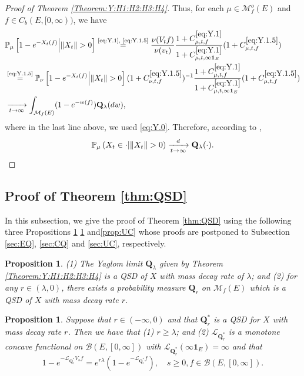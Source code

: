 \documentclass[12pt,a4paper]{amsart}
\numberwithin{equation}{section}
\theoremstyle{plain}
\newtheorem{prop}[thm]{Proposition}
\theoremstyle{definition}
\theoremstyle{remark}
\begin{document}
\begin{proof}[Proof of Theorem \ref{Theorem:Y:H1:H2:H3:H4}]
	Thus, for each $\mu \in \mathcal M^o_f(E)$ and $f\in C_b(E,[0,\infty))$, we have
\begin{align}
&\mathbb P_\mu \left[1 - e^{-X_t(f)} \middle|\|X_t\|>0\right]
	 \overset{\text{\eqref{eq:Y.1}, \eqref{eq:Y.1.5}}}= \frac{ \nu(V_tf) }{ \nu(v_t) } \frac{1+C^{\eqref{eq:Y.1}}_{\mu,t,f}}{1+C^{\eqref{eq:Y.1}}_{\mu, t,\infty \mathbf 1_E}}(1+ C^{\eqref{eq:Y.1.5}}_{\mu,t,f})
	\\& \overset{\text{\eqref{eq:Y.1.5}}}= \mathbb P_\nu \left[1 - e^{-X_t(f)} \middle| \|X_t\|>0\right](1+C^{\eqref{eq:Y.1.5}}_{\nu, t,f})^{-1}  \frac{1+C^{\eqref{eq:Y.1}}_{\mu,t,f}}{1+C^{\eqref{eq:Y.1}}_{\mu,  t,\infty \mathbf 1_E}}(1+ C^{\eqref{eq:Y.1.5}}_{\mu,t,f})
	\\&\xrightarrow[t\to \infty]{} \int_{\mathcal M_f(E)}(1-e^{-w(f)}) \mathbf Q_\lambda(dw),
\end{align}
	where in the last line above, we used \eqref{eq:Y.0}.
	Therefore, according to \cite[Theorem 1.18]{Li2011MeasureValued},
	\[\mathbb P_\mu\left(X_t \in \cdot \middle| \|X_t\|>0\right) \xrightarrow[t\to \infty]{d} \mathbf Q_\lambda(\cdot). \qedhere\]
\end{proof}

\subsection{Proof of Theorem \ref{thm:QSD}}
	In this subsection,
	we give the proof of Theorem \ref{thm:QSD} using the following three 
	Propositions \ref{prop:EQ} \ref{prop:CQ} and\ref{prop:UC}  whose proofs are postponed to Subsection \ref{sec:EQ}, \ref{sec:CQ} and \ref{sec:UC}, respectively.

\begin{prop} \label{prop:EQ}
	(1) The Yaglom limit $\mathbf Q_\lambda$ given by Theorem \ref{Theorem:Y:H1:H2:H3:H4} is a QSD of $X$ with mass decay rate of $\lambda$; and
	(2) for any $r \in (\lambda , 0)$, 
	there exists a probability measure $\mathbf Q_r$  on $\mathcal M_f(E)$ which is a QSD of $X$ with mass decay rate $r$.
\end{prop}


\begin{prop} \label{prop:CQ}
	Suppose that $r \in (-\infty, 0)$ and that  $\mathbf Q^*_{r}$ 
	is a QSD
	for $X$ with mass decay rate $r$. 
	Then we have that (1) $r \geq \lambda$; and 
	(2) $\mathscr L_{\mathbf Q^*_r}$ is a monotone concave functional on $\mathcal B(E,[0,\infty])$ with $\mathscr L_{\mathbf Q^*_r}(\infty \mathbf 1_E) = \infty$ and that
\[
	1 - e^{- \mathscr L_{\mathbf Q^*_r} V_s f} = e^{r\lambda }(1- e^{- \mathscr L_{\mathbf Q^*_r} f}), \quad s\geq 0, f\in \mathcal B(E,[0,\infty]).
\]
\end{prop}
\end{document}
